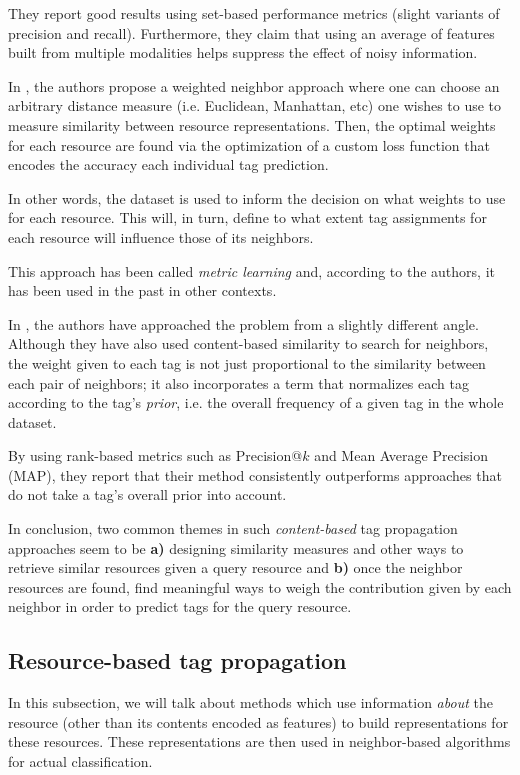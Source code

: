 They report good results using set-based performance metrics (slight variants of precision and recall). Furthermore, they claim that using an average of features built from multiple modalities helps suppress the effect of noisy information.

In \cite{guillaumin_etal_2009}, the authors propose a weighted neighbor approach where one can choose an arbitrary distance measure (i.e. Euclidean, Manhattan, etc) one wishes to use to measure similarity between resource representations. Then, the optimal weights for each resource are found via the optimization of a custom loss function that encodes the accuracy each individual tag prediction. 

In other words, the dataset is used to inform the decision on what weights to use for each resource. This will, in turn, define to what extent tag assignments for each resource will influence those of its neighbors.

This approach has been called \textit{metric learning} and, according to the authors, it has been used in the past in other contexts.

In \cite{li_etal_2009}, the authors have approached the problem from a slightly different angle. Although they have also used content-based similarity to search for neighbors, the weight given to each tag is not just proportional to the similarity between each pair of neighbors; it also incorporates a term that normalizes each tag according to the tag's \textit{prior}, i.e. the overall frequency of a given tag in the whole dataset.

By using rank-based metrics such as Precision@$k$ and Mean Average Precision (MAP), they report that their method consistently outperforms approaches that do not take a tag's overall prior into account.

In conclusion, two common themes in such \textit{content-based} tag propagation approaches seem to be \textbf{a)} designing similarity measures and other ways to retrieve similar resources given a query resource and \textbf{b)} once the neighbor resources are found, find meaningful ways to weigh the contribution given by each neighbor in order to predict tags for the query resource. 

\subsection{Resource-based tag propagation}

In this subsection, we will talk about methods which use information \textit{about} the resource (other than its contents encoded as features) to build representations for these resources. These representations are then used in neighbor-based algorithms for actual classification.

